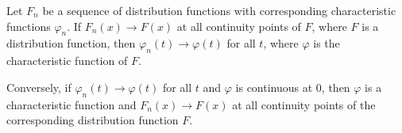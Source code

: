 Let $F_n$ be a sequence of distribution functions with corresponding characteristic functions $\varphi_n$. If $F_n(x) \to F(x)$ at all continuity points of $F$, where $F$ is a distribution function, then $\varphi_n(t) \to \varphi(t)$ for all $t$, where $\varphi$ is the characteristic function of $F$.

Conversely, if $\varphi_n(t) \to \varphi(t)$ for all $t$ and $\varphi$ is continuous at $0$, then $\varphi$ is a characteristic function and $F_n(x) \to F(x)$ at all continuity points of the corresponding distribution function $F$.
